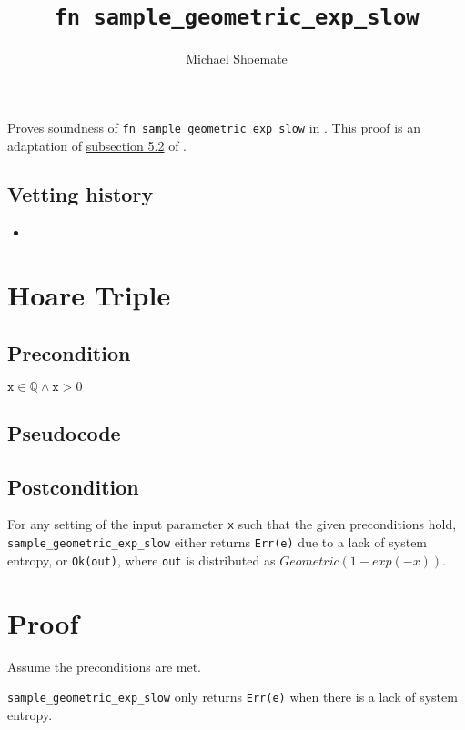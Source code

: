 \documentclass{article}
\title{\texttt{fn sample\_geometric\_exp\_slow}}
\author{Michael Shoemate}
\begin{document}
\maketitle

\contrib
Proves soundness of \texttt{fn sample\_geometric\_exp\_slow} in .
This proof is an adaptation of \href{https://arxiv.org/pdf/2004.00010.pdf#subsection.5.2}{subsection 5.2} of \cite{CKS20}.

\subsection*{Vetting history}
\begin{itemize}
    \item {}
\end{itemize}

\section{Hoare Triple}
\subsection*{Precondition}
$\texttt{x} \in \mathbb{Q} \land \texttt{x} > 0$

\subsection*{Pseudocode}


\subsection*{Postcondition}\label{postcondition}
For any setting of the input parameter \texttt{x} such that the given preconditions hold, \\
\texttt{sample\_geometric\_exp\_slow} either returns \texttt{Err(e)} due to a lack of system entropy,
or \texttt{Ok(out)}, where \texttt{out} is distributed as $Geometric(1 - exp(-x))$.

\section{Proof}
Assume the preconditions are met.

\begin{lemma}\label{err-e}
    \texttt{sample\_geometric\_exp\_slow} only returns \texttt{Err(e)} when there is a lack of system entropy.
\end{lemma}
\end{document}
